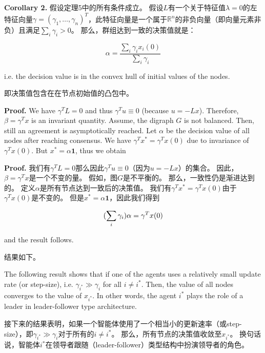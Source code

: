 \documentclass{article}
\begin{document}
\noindent \textbf{Corollary 2.} 假设定理5中的所有条件成立。
假设$L$有一个关于特征值$\lambda=0$的左特征向量$\gamma = (\gamma_1, \dots, \gamma_n)^T$，此特征向量是一个属于$\mathbb{R}^n$的非负向量（即向量元素非负）且满足$\sum_i\gamma_i>0$。
那么，群组达到一致的决策值就是：

\begin{equation}
    \alpha = \frac{\sum_i \gamma_ix_i(0)}{\sum_i\gamma_i}
    \tag{19}
    \label{19}
\end{equation}

{\color[gray]{0.5}
\noindent i.e. the decision value is in the convex hull of initial values of the nodes.
}

\noindent 即决策值包含在在节点初始值的凸包中。

{\color[gray]{0.5}
\noindent \textbf{Proof.} We have $\gamma^TL=0$ and thus $\gamma^Tu\equiv0$ (because $u=-Lx$). 
Therefore, $\beta=\gamma^Tx$ is an invariant quantity. 
Assume, the digraph $G$ is not balanced. 
Then, still an agreement is asymptotically reached. 
Let $\alpha$ be the decision value of all nodes after reaching consensus. 
We have $\gamma^Tx^*=\gamma^Tx(0)$ due to invariance of $\gamma^Tx(0)$. 
But $x^*=\alpha\mathbf{1}$, thus we obtain
}

\noindent \textbf{Proof.} 
我们有$\gamma^TL=0$那么因此$\gamma^Tu\equiv0$（因为$u=-Lx$）的集合。
因此，$\beta=\gamma^Tx$是一个不变的量。
假如，图$G$是不平衡的。
那么，一致性仍是渐进达到的。
定义$\alpha$是所有节点达到一致后的决策值。
我们有$\gamma^Tx^*=\gamma^Tx(0)$由于$\gamma^Tx(0)$是不变的。
但是$x^*=\alpha\mathbf{1}$，因此我们得到

\begin{equation}
    (\sum_i\gamma_i)\alpha = \gamma^Tx(0)
    \notag
\end{equation}

{\color[gray]{0.5}
\noindent and the result follows.
}

\noindent 结果如下。

{\color[gray]{0.5}
The following result shows that if one of the agents uses a relatively small update rate (or step-size), i.e. $\gamma_{i^*}\gg\gamma_i$ for all $i\ne i^*$. 
Then, the value of all nodes converges to the value of $x_{i^*}$. 
In other words, the agent $i^*$ plays the role of a leader in leader-follower type architecture.
}

接下来的结果表明，如果一个智能体使用了一个相当小的更新速率（或step-size），即$\gamma_{i^*}\gg\gamma_i$对于所有的$i\ne i^*$。
那么，所有节点的决策值收敛至$x_{i^*}$。
换句话说，智能体$i^*$在领导者跟随（leader-follower）类型结构中扮演领导者的角色。
\end{document}
